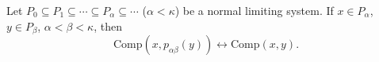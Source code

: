 Let $P_0 \subseteq P_1 \subseteq \cdots \subseteq P_\alpha \subseteq \cdots$ ($\alpha < \kappa$) be a normal limiting system. If $x \in P_\alpha$, $y \in P_\beta$, $\alpha < \beta < \kappa$, then
$$\text{Comp}(x, p_{\alpha\beta}(y)) \leftrightarrow \text{Comp}(x, y).$$
